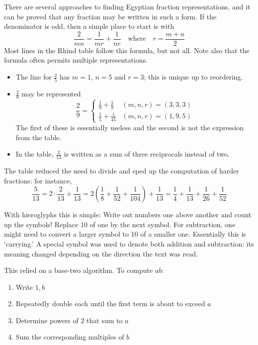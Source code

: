There are several approaches to finding Egyptian fraction representations, and it can be proved that any fraction may be written in such a form. If the denominator is odd, then a simple place to start is with
\[\frac 2{mn}=\frac 1{mr}+\frac 1{nr}\quad\text{where}\quad r=\frac{m+n}2\]
Most lines in the Rhind table follow this formula, but not all. Note also that the formula often permits multiple representations.
\begin{itemize}
  \item The line for $\frac 25$ has $m=1$, $n=5$ and $r=3$; this is unique up to reordering.
  \item $\frac 29$ may be represented
  \[\frac 29=\begin{cases}
  	\frac 19+\frac 19&(m,n,r)=(3,3,3)\\
  	\frac 15+\frac 1{45}&(m,n,r)=(1,9,5) 	
  \end{cases}\]
  The first of these is essentially useless and the second is not the expression from the table.
  \item In the table, $\frac 2{13}$ is written as a sum of three reciprocals instead of two.
\end{itemize}

The table reduced the need to divide and sped up the computation of harder fractions: for instance,
\[\frac 5{13}=2\cdot\frac 2{13}+\frac 1{13}=2\left(\frac 18+\frac 1{52}+\frac 1{104}\right)+\frac 1{13}=\frac 14+\frac 1{13}+\frac 1{26}+\frac 1{52}\]



 

 With hieroglyphs this is simple: Write out numbers one above another and count up the symbols! Replace 10 of one by the next symbol. For subtraction, one might need to convert a larger symbol to 10 of a smaller one. Essentially this is `carrying.' A special symbol was used to denote both addition and subtraction: its meaning changed depending on the direction the text was read.

 This relied on a base-two algorithm. To compute $ab$:
\begin{enumerate}
  \item Write $1,b$
  \item Repeatedly double each until the first term is about to exceed $a$
  \item Determine powers of 2 that sum to $a$
  \item Sum the corresponding multiples of $b$
\end{enumerate}

